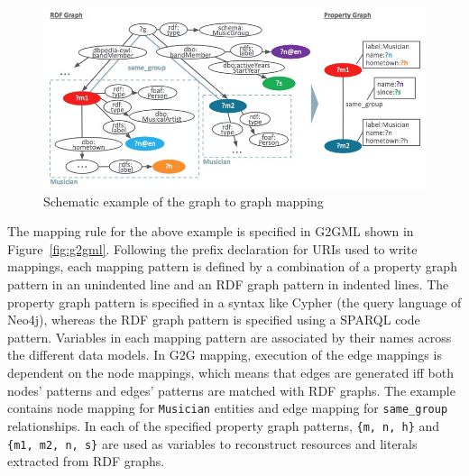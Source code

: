 \documentclass[runningheads]{llncs}
\begin{document}
\begin{figure}
\center
\includegraphics[width=1.0\textwidth]{example.jpg}
\caption{Schematic example of the graph to graph mapping}
\label{fig:conversion}
\end{figure}

The mapping rule for the above example is specified in G2GML shown in Figure~\ref{fig:g2gml}. Following the prefix declaration for URIs used to write mappings, each mapping pattern is defined by a combination of a property graph pattern in an unindented line and an RDF graph pattern in indented lines. The property graph pattern is specified in a syntax like Cypher (the query language of Neo4j), whereas the RDF graph pattern is specified using a SPARQL code pattern. 
Variables in each mapping pattern are associated by their names across the different data models. 
In G2G mapping, execution of the edge mappings is dependent on the node mappings, which means that edges are generated iff both nodes' patterns and edges' patterns are matched with RDF graphs. 
The example contains node mapping for \texttt{Musician} entities and edge mapping for \texttt{same\_group} relationships.
In each of the specified property graph patterns, \texttt{\{m, n, h\}} and \texttt{\{m1, m2, n, s\}} are used as variables to reconstruct resources and literals extracted from RDF graphs. 
\end{document}
